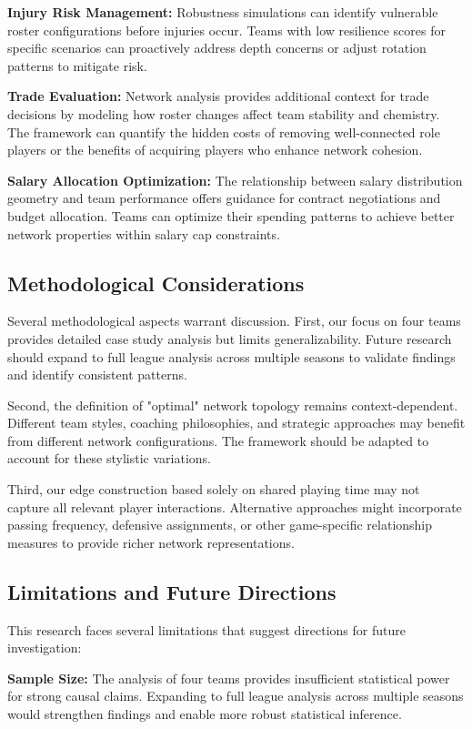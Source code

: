 \documentclass[11pt]{article}
\begin{document}
\textbf{Injury Risk Management:} Robustness simulations can identify vulnerable roster configurations before injuries occur. Teams with low resilience scores for specific scenarios can proactively address depth concerns or adjust rotation patterns to mitigate risk.

\textbf{Trade Evaluation:} Network analysis provides additional context for trade decisions by modeling how roster changes affect team stability and chemistry. The framework can quantify the hidden costs of removing well-connected role players or the benefits of acquiring players who enhance network cohesion.

\textbf{Salary Allocation Optimization:} The relationship between salary distribution geometry and team performance offers guidance for contract negotiations and budget allocation. Teams can optimize their spending patterns to achieve better network properties within salary cap constraints.

\subsection{Methodological Considerations}

Several methodological aspects warrant discussion. First, our focus on four teams provides detailed case study analysis but limits generalizability. Future research should expand to full league analysis across multiple seasons to validate findings and identify consistent patterns.

Second, the definition of "optimal" network topology remains context-dependent. Different team styles, coaching philosophies, and strategic approaches may benefit from different network configurations. The framework should be adapted to account for these stylistic variations.

Third, our edge construction based solely on shared playing time may not capture all relevant player interactions. Alternative approaches might incorporate passing frequency, defensive assignments, or other game-specific relationship measures to provide richer network representations.

\subsection{Limitations and Future Directions}

This research faces several limitations that suggest directions for future investigation:

\textbf{Sample Size:} The analysis of four teams provides insufficient statistical power for strong causal claims. Expanding to full league analysis across multiple seasons would strengthen findings and enable more robust statistical inference.
\end{document}
